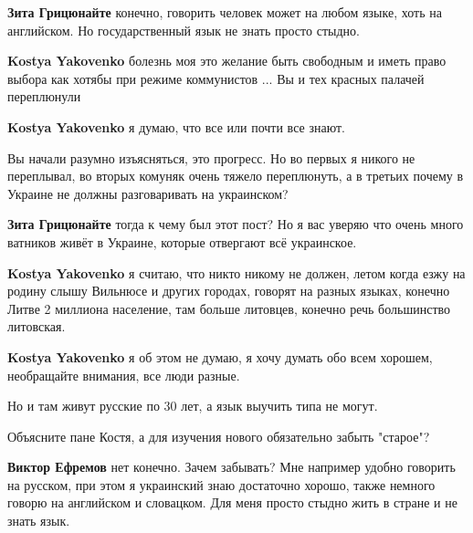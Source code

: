 \begin{itemize}
\begin{itemize}
\textbf{Зита Грицюнайте} конечно, говорить человек может на любом языке, хоть на английском. Но государственный язык не знать просто стыдно.

\textbf{Kostya Yakovenko} болезнь моя это желание быть свободным и иметь право выбора как хотябы при режиме коммунистов ... Вы и тех красных палачей переплюнули

\textbf{Kostya Yakovenko} я думаю, что все или почти все знают.


Вы начали разумно изъясняться, это прогресс. Но во первых я никого не
переплывал, во вторых комуняк очень тяжело переплюнуть, а в третьих почему в
Украине не должны разговаривать на украинском?

\textbf{Зита Грицюнайте} тогда к чему был этот пост? Но я вас уверяю что очень много ватников живёт в Украине, которые отвергают всё украинское.

\textbf{Kostya Yakovenko} я считаю, что никто никому не должен, летом когда
езжу на родину слышу Вильнюсе и других городах, говорят на разных языках,
конечно Литве 2 миллиона население, там больше литовцев, конечно речь
большинство литовская.

\textbf{Kostya Yakovenko} я об этом не думаю, я хочу думать обо всем хорошем, необращайте внимания, все люди разные.

Но и там живут русские по 30 лет, а язык выучить типа не могут.

Объясните пане Костя, а для изучения нового обязательно забыть "старое"?

\textbf{Виктор Ефремов} нет конечно. Зачем забывать? Мне например удобно
говорить на русском, при этом я украинский знаю достаточно хорошо, также
немного говорю на английском и словацком. Для меня просто стыдно жить в стране
и не знать язык.



\end{itemize}
\end{itemize}
